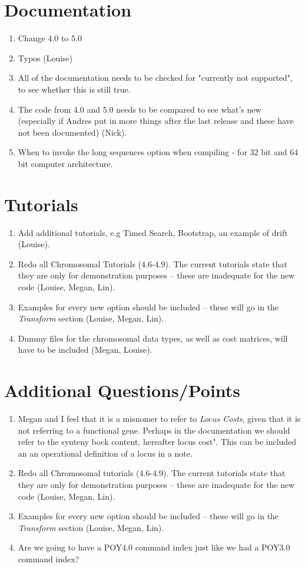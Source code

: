 \documentclass[11pt]{article}
\begin{document}
\section{Documentation}
\begin{enumerate}
\item{Change 4.0 to 5.0}
\item{Typos (Louise)}
\item{All of the documentation needs to be checked for "currently not supported", to see whether this is still true.}
\item{The code from 4.0 and 5.0 needs to be compared to see what's new (especially if Andres put in more things after the last release and these have not been documented) (Nick).}
\item{When to invoke the long sequences option when compiling - for 32 bit and 64 bit computer architecture.}
\end{enumerate}

\section{Tutorials}
\begin{enumerate}
\item{Add additional tutorials, e.g Timed Search, Bootstrap, an example of drift (Louise).}
\item{Redo all Chromosomal Tutorials (4.6-4.9).  The current tutorials state that they are only for demonstration purposes -- these are inadequate for the new code (Louise, Megan, Lin).}
\item{Examples for every new option should be included -- these will go in the \emph{Transform} section (Louise, Megan, Lin).}
\item{Dummy files for the chromosomal data types, as well as cost matrices, will have to be included (Megan, Louise).}
\end{enumerate}

\section{Additional Questions/Points}
\begin{enumerate}
\item{Megan and I feel that it is a misnomer to refer to \emph{Locus Costs}, given that it is not referring to a functional gene.  Perhaps in the documentation we should refer to the synteny bock content, hereafter locus cost".  This can be included an an operational definition of a locus in a note.}
\item{Redo all Chromosomal tutorials (4.6-4.9).  The current tutorials state that they are only for demonstration purposes -- these are inadequate for the new code (Louise, Megan, Lin).}
\item{Examples for every new option should be included -- these will go in the \emph{Transform} section (Louise, Megan, Lin).}
\item{Are we going to have a POY4.0 command index just like we had a POY3.0 command index?}
\end{enumerate}
\end{document}
